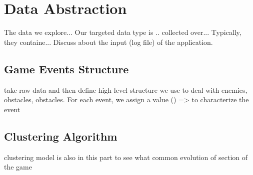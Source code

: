 \chapter{Data Abstraction}
The data we explore...
Our targeted data type is .. collected over... Typically, they containe...
Discuss about the input (log file) of the application.

\section{Game Events Structure}
take raw data and then define high level structure we use to deal with enemies, obstacles, obstacles. For each event, we assign a value () => to characterize the event
\section{Clustering Algorithm}
clustering model is also in this part to see what common evolution of section of the game